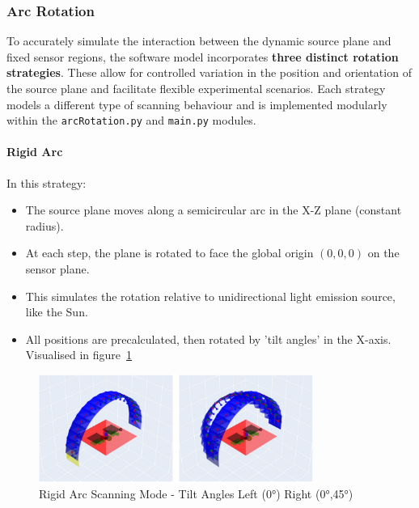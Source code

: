 \subsubsection{Arc Rotation}
To accurately simulate the interaction between the dynamic source plane and fixed sensor regions, the software model incorporates \textbf{three distinct rotation strategies}. These allow for controlled variation in the position and orientation of the source plane and facilitate flexible experimental scenarios.
Each strategy models a different type of scanning behaviour and is implemented modularly within the \texttt{arcRotation.py} and \texttt{main.py} modules.

\paragraph{Rigid Arc}

In this strategy:
\begin{itemize}
    \item The source plane moves along a semicircular arc in the X-Z plane (constant radius).
    \item At each step, the plane is rotated to face the global origin $(0,0,0)$ on the sensor plane.
    \item This simulates the rotation relative to unidirectional light emission source, like the Sun. 
    \item All positions are precalculated, then rotated by 'tilt angles' in the X-axis. Visualised in figure~\ref{fig:Ridig Arc Scanning Mode}   
\end{itemize} 

\begin{figure}[htbp] %
    \centering
    \includegraphics[width=0.8\textwidth]{chapters/methodology/SoftwareModel/images/Rigid Arc.png} %
    \caption{Rigid Arc Scanning Mode - Tilt Angles Left (0°) Right (0°,45°) }       %
    \label{fig:Ridig Arc Scanning Mode}            %
\end{figure}   

